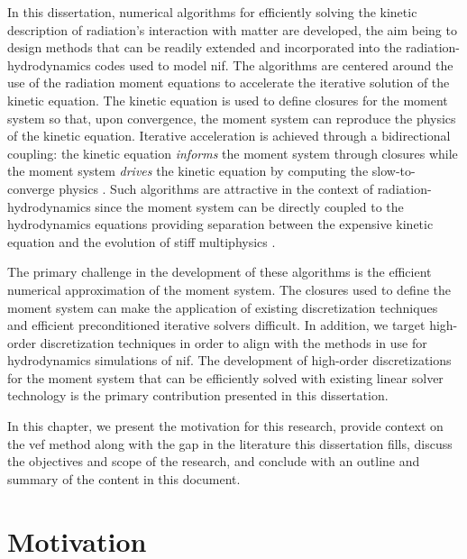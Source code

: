 \documentclass[../doc.tex]{subfiles}
\begin{document}
In this dissertation, numerical algorithms for efficiently solving the kinetic description of radiation's interaction with matter are developed, the aim being to design methods that can be readily extended and incorporated into the radiation-hydrodynamics codes used to model \gls{nif}. The algorithms are centered around the use of the radiation moment equations to accelerate the iterative solution of the kinetic equation. The kinetic equation is used to define closures for the moment system so that, upon convergence, the moment system can reproduce the physics of the kinetic equation. 
Iterative acceleration is achieved through a bidirectional coupling: the kinetic equation \emph{informs} the moment system through closures while the moment system \emph{drives} the kinetic equation by computing the slow-to-converge physics \cite{CHACON201721}. Such algorithms are attractive in the context of radiation-hydrodynamics since the moment system can be directly coupled to the hydrodynamics equations providing separation between the expensive kinetic equation and the evolution of stiff multiphysics \cite{doi:10.13182/NSE16-45}. 

The primary challenge in the development of these algorithms is the efficient numerical approximation of the moment system. The closures used to define the moment system can make the application of existing discretization techniques and efficient preconditioned iterative solvers difficult. In addition, we target high-order discretization techniques in order to align with the methods in use for hydrodynamics simulations of \gls{nif}. The development of high-order discretizations for the moment system that can be efficiently solved with existing linear solver technology is the primary contribution presented in this dissertation. 

In this chapter, we present the motivation for this research, provide context on the \gls{vef} method along with the gap in the literature this dissertation fills, discuss the objectives and scope of the research, and conclude with an outline and summary of the content in this document. 

\section{Motivation}
\end{document}
